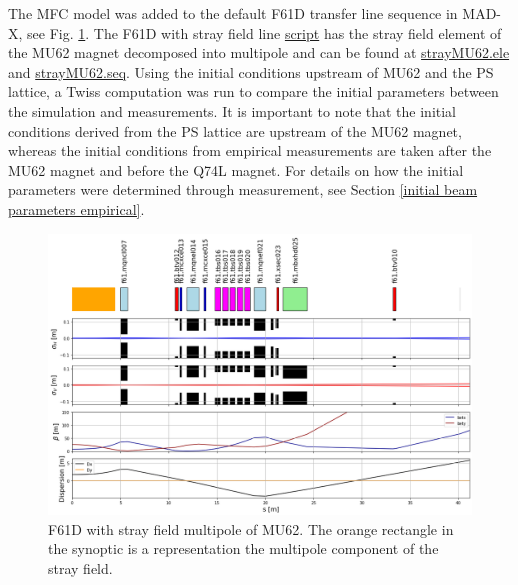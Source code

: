 The MFC model was added to the default F61D transfer line sequence in MAD-X, see Fig. \ref{fig:f61d_with_stray}. The F61D with stray field line \href{https://gitlab.cern.ch/eljohnso/acc-models-tls-eliott-fork/-/blob/c6cbcafacca274000d2bfc501f39cf711375de90/ps_extraction/east-fast-extraction/f61d_with_stray/F61D_with_stray.ipynb}{script} has the stray field element of the MU62 magnet decomposed into multipole and can be found at \href{https://gitlab.cern.ch/eljohnso/acc-models-tls-eliott-fork/-/blob/c6cbcafacca274000d2bfc501f39cf711375de90/ps_extraction/east-fast-extraction/f61d_with_stray/strayMU62.ele}{strayMU62.ele} and \href{https://gitlab.cern.ch/eljohnso/acc-models-tls-eliott-fork/-/blob/c6cbcafacca274000d2bfc501f39cf711375de90/ps_extraction/east-fast-extraction/f61d_with_stray/strayMU62.seq}{strayMU62.seq}. Using the initial conditions upstream of MU62 and the PS lattice, a Twiss computation was run to compare the initial parameters between the simulation and measurements. It is important to note that the initial conditions derived from the PS lattice are upstream of the MU62 magnet, whereas the initial conditions from empirical measurements are taken after the MU62 magnet and before the Q74L magnet. For details on how the initial parameters were determined through measurement, see Section \ref{initial beam parameters empirical}.

\begin{figure}[H]
\centering
\includegraphics[width=1.0\textwidth]{02_Simulation/images/F61D_with_stray.png}
\caption{F61D with stray field multipole of MU62. The orange rectangle in the synoptic is a representation the multipole component of the stray field.}
\label{fig:f61d_with_stray}
\end{figure}


